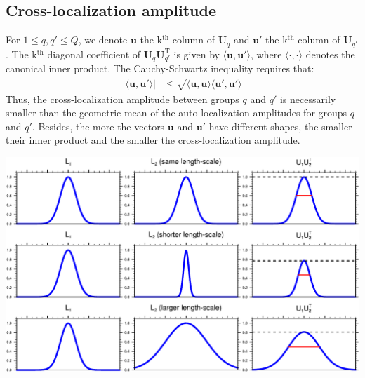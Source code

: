 \documentclass[12pt]{scrartcl}
\begin{document}
\subsection{Cross-localization amplitude}
For $1 \le q,q' \le Q$, we denote $\mathbf{u}$ the k$^\textrm{th}$ column of $\mathbf{U}_q$ and $\mathbf{u}'$ the k$^\textrm{th}$ column of $\mathbf{U}_{q'}$. The k$^\textrm{th}$ diagonal coefficient of $\mathbf{U}_q \mathbf{U}_{q'}^\mathrm{T}$ is given by $\langle \mathbf{u},\mathbf{u}' \rangle$, where $\langle \cdot, \cdot \rangle$ denotes the canonical inner product. The Cauchy-Schwartz inequality requires that:
\begin{align}
\vert \langle \mathbf{u},\mathbf{u}' \rangle \vert & \le \sqrt{\langle \mathbf{u},\mathbf{u} \rangle \langle \mathbf{u}',\mathbf{u}' \rangle}
\end{align}
Thus, the cross-localization amplitude between groups $q$ and $q'$ is necessarily smaller than the geometric mean of the auto-localization amplitudes for groups $q$ and $q'$. Besides, the more the vectors $\mathbf{u}$ and $\mathbf{u}'$ have different shapes, the smaller their inner product and the smaller the cross-localization amplitude.
\begin{center}
\includegraphics[width=\linewidth]{convolution_exp.pdf}
\end{center}



\end{document}
